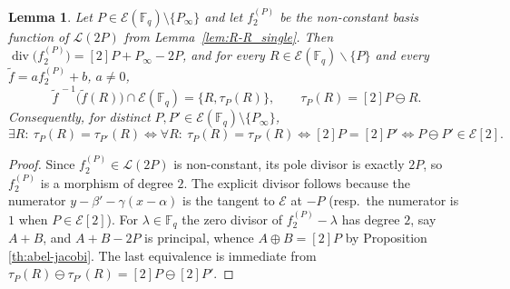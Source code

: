 \documentclass[sn-mathphys-num]{sn-jnl_modified}
\newcommand{\FF}{\ensuremath{\mathbb{F}}}
\newtheorem{lemma}[theorem]{Lemma}
\begin{document}
\begin{lemma}\label{lem:involution}
Let $P \in \mathcal{E}(\FF_q)\setminus\{P_\infty\}$ and let $f_2^{(P)}$ be the non-constant basis function of $\mathscr{L}(2P)$ from Lemma~\ref{lem:R-R_single}. Then
$\operatorname{div}\bigl(f_2^{(P)}\bigr) = [2]P + P_\infty - 2P$, and for every
$R \in \mathcal{E}(\FF_q)\backslash \{P\}$ and every $\widetilde f = a f_2^{(P)} + b$, $a \neq 0$,
\[
\widetilde f^{\,-1}\bigl(\widetilde f(R)\bigr) \cap \mathcal{E}(\FF_q)
= \{R, \tau_P(R)\}, \qquad \tau_P(R) = [2]P \ominus R.
\] 
Consequently, for distinct $P, P' \in \mathcal{E}(\FF_q)\setminus\{P_\infty\}$,
\[
\exists R:\ \tau_P(R) = \tau_{P'}(R)
\iff \forall R:\ \tau_P(R) = \tau_{P'}(R)
\iff [2]P = [2]P' \iff P \ominus P' \in \mathcal{E}[2].
\]
\end{lemma}
\begin{proof}
Since $f_2^{(P)} \in \mathscr{L}(2P)$ is non-constant, its pole divisor is exactly $2P$, so $f_2^{(P)}$ is a morphism of degree $2$. The explicit divisor follows because the numerator $y - \beta' - \gamma(x-\alpha)$ is the tangent to $\mathcal{E}$ at $-P$ (resp.\ the numerator is $1$ when $P \in \mathcal{E}[2]$). For $\lambda \in \FF_q$ the zero divisor of $f_2^{(P)}-\lambda$ has degree $2$, say $A+B$, and $A + B - 2P$ is principal, whence $A \oplus B = [2]P$ by Proposition \ref{th:abel-jacobi}. The last equivalence is immediate from $\tau_P(R) \ominus \tau_{P'}(R) = [2]P \ominus [2]P'$.
\end{proof}
\end{document}
